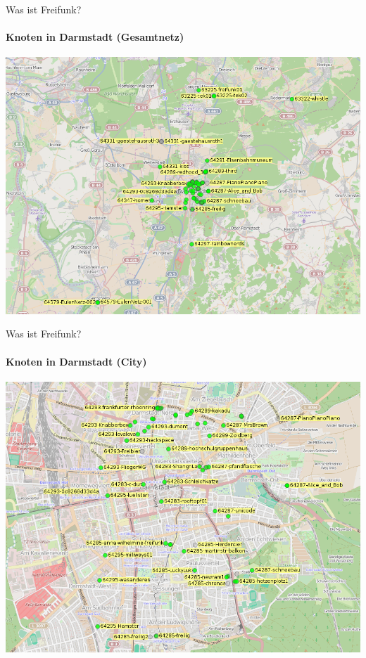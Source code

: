 \documentclass{beamer}
\begin{document}
\begin{frame}{Was ist Freifunk?}
\framesubtitle{Knoten in Darmstadt (Gesamtnetz)}
\begin{center}
\includegraphics[height=0.75\textheight]{images/ffmap_darmstadt} \newline
\end{center}
\end{frame}

\begin{frame}{Was ist Freifunk?}
\framesubtitle{Knoten in Darmstadt (City)}
\begin{center}
\includegraphics[height=0.75\textheight]{images/ffmap_darmstadt_city} \newline
\end{center}
\end{frame}
\end{document}
